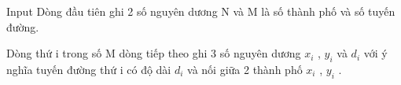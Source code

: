 Input
Dòng đầu tiên ghi 2 số nguyên dương N và M là số thành phố và số tuyến đường.  

   Dòng thứ i trong số M dòng tiếp theo ghi 3 số nguyên dương $x_{i}$   , $y_{i}$   và $d_{i}$   với ý nghĩa tuyến đường thứ i có độ dài $d_{i}$   và nối giữa 2 thành phố $x_{i}$   , $y_{i}$   .